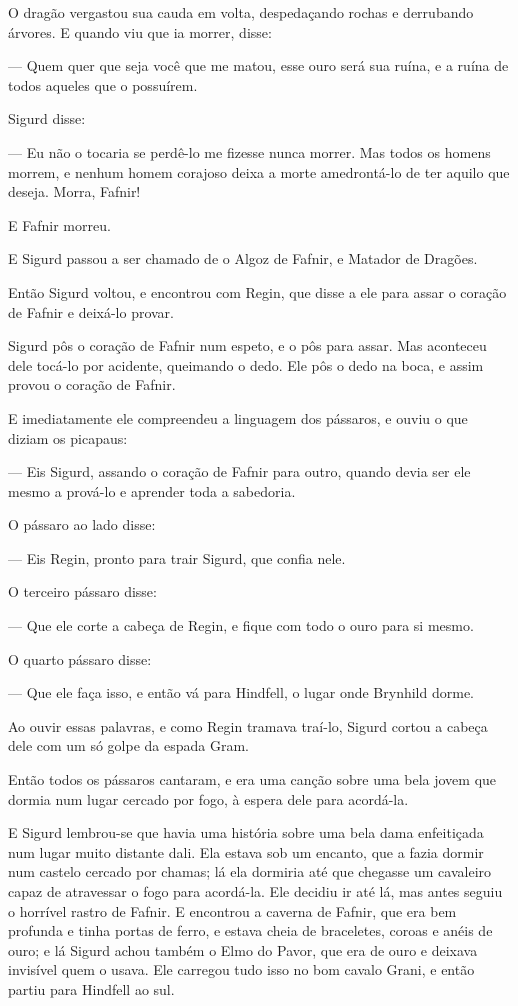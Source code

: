 O dragão vergastou sua cauda em volta, despedaçando rochas e
derrubando árvores. E quando viu que ia morrer, disse:

— Quem quer que seja você que me matou, esse ouro será sua ruína, e a
ruína de todos aqueles que o possuírem. 

Sigurd disse:

— Eu não o tocaria se perdê-lo me fizesse nunca morrer. Mas todos os
homens morrem, e nenhum homem corajoso deixa a morte amedrontá-lo de
ter aquilo que deseja. Morra, Fafnir! 

E Fafnir morreu. 

E Sigurd passou a ser chamado de o Algoz de Fafnir, e Matador de
Dragões. 

Então Sigurd voltou, e encontrou com Regin, que disse a ele para assar
o coração de Fafnir e deixá-lo provar. 

Sigurd pôs o coração de Fafnir num espeto, e o pôs para assar. Mas
aconteceu dele tocá-lo por acidente, queimando o dedo. Ele pôs o dedo
na boca, e assim provou o coração de Fafnir. 

E imediatamente ele compreendeu a linguagem dos pássaros, e ouviu o
que diziam os picapaus:

— Eis Sigurd, assando o coração de Fafnir para outro, quando devia ser
ele mesmo a prová-lo e aprender toda a sabedoria. 

O pássaro ao lado disse:

— Eis Regin, pronto para trair Sigurd, que confia nele. 

O terceiro pássaro disse:

— Que ele corte a cabeça de Regin, e fique com todo o ouro para si
mesmo.

O quarto pássaro disse:

— Que ele faça isso, e então vá para Hindfell, o lugar onde Brynhild
dorme. 

Ao ouvir essas palavras, e como Regin tramava traí-lo, Sigurd cortou a
cabeça dele com um só golpe da espada Gram.

Então todos os pássaros cantaram, e era uma canção sobre uma bela
jovem que dormia num lugar cercado por fogo, à espera dele para
acordá-la. 

E Sigurd lembrou-se que havia uma história sobre uma bela dama
enfeitiçada num lugar muito distante dali. Ela estava sob um encanto,
que a fazia dormir num castelo cercado por chamas; lá ela dormiria
até que chegasse um cavaleiro capaz de atravessar o fogo para
acordá-la. Ele decidiu ir até lá, mas antes seguiu o horrível rastro
de Fafnir. E encontrou a caverna de Fafnir, que era bem profunda e
tinha portas de ferro, e estava cheia de braceletes, coroas e anéis
de ouro; e lá Sigurd achou também o Elmo do Pavor, que era de ouro e
deixava invisível quem o usava. Ele carregou tudo isso no bom cavalo
Grani, e então partiu para Hindfell ao sul. 

